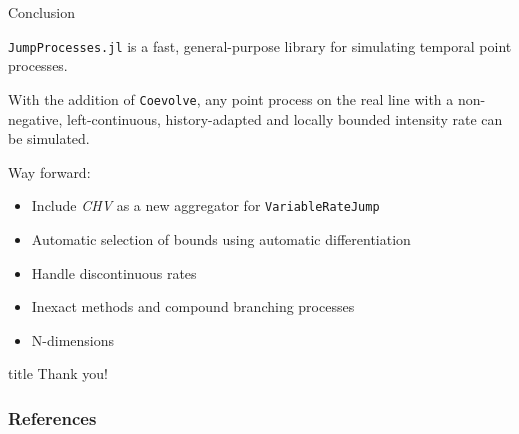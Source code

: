 \documentclass[
  ignorenonframetext,
  aspectratio=169,
  xcolor={dvipsnames,rgb}
]{beamer}
\begin{document}
\begin{frame}{Conclusion}

\texttt{JumpProcesses.jl} is a fast, general-purpose library for simulating temporal point processes. 

With the addition of \texttt{Coevolve}, any point process on the real line with a non-negative, left-continuous, history-adapted and locally bounded intensity rate can be simulated.

Way forward:

\begin{itemize}

  \item Include \textit{CHV} as a new aggregator for \texttt{VariableRateJump}

  \item Automatic selection of bounds using automatic differentiation

  \item Handle discontinuous rates

  \item Inexact methods and compound branching processes

  \item N-dimensions

\end{itemize}

\end{frame}

\begin{frame}
  \thispagestyle{empty@titlepage}
  \begingroup
    \begin{beamercolorbox}[sep=8pt,center]{title}%
      {Thank you!}%
    \end{beamercolorbox}
  \endgroup
\end{frame}

\begin{frame}[t,allowframebreaks]
  \frametitle{References}
  \printbibliography[heading=none]
\end{frame}
\end{document}
